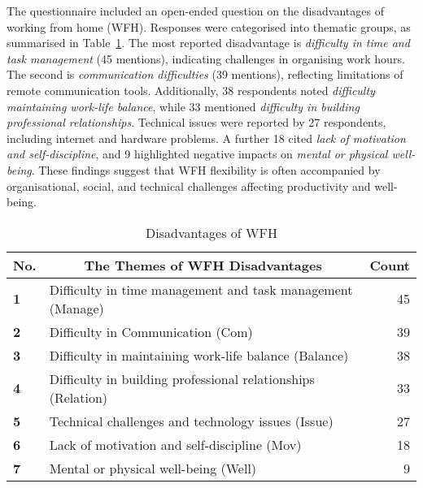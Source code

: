 \documentclass[conference]{IEEEtran}
\begin{document}
The questionnaire included an open-ended question on the disadvantages of working from home (WFH). Responses were categorised into thematic groups, as summarised in Table~\ref{Disadvantages of WFH}. The most reported disadvantage is \textit{difficulty in time and task management} (45 mentions), indicating challenges in organising work hours. The second is \textit{communication difficulties} (39 mentions), reflecting limitations of remote communication tools. Additionally, 38 respondents noted \textit{difficulty maintaining work-life balance}, while 33 mentioned \textit{difficulty in building professional relationships}. Technical issues were reported by 27 respondents, including internet and hardware problems. A further 18 cited \textit{lack of motivation and self-discipline}, and 9 highlighted negative impacts on \textit{mental or physical well-being}. These findings suggest that WFH flexibility is often accompanied by organisational, social, and technical challenges affecting productivity and well-being.

\begin{table}[ht]
	\caption{Disadvantages of WFH}
	\label{Disadvantages of WFH}
	\begin{tabular}{|p{}|p{}|r|}
		\hline
		\multicolumn{1}{|c|}{\textbf{No.}} & \multicolumn{1}{c|}{\textbf{The Themes of WFH Disadvantages}} & \multicolumn{1}{c|}{\textbf{Count}} \\ \hline
		\textbf{1}                 & Difficulty in time management and task management (Manage) & 45 %
		\\ \hline
		\textbf{2}                 & Difficulty in Communication (Com) & 39 %
		\\ \hline
		\textbf{3}                 & Difficulty in maintaining work-life balance (Balance)    & 38 %
		\\ \hline
		\textbf{4}                 & Difficulty in building professional relationships (Relation)  & 33 %
		\\ \hline
		\textbf{5}                 & Technical challenges and technology issues (Issue)     & 27
		\\ \hline
		\textbf{6}                 & Lack of motivation and self-discipline (Mov)       & 18 %
		\\ \hline
		\textbf{7}                 & Mental or physical well-being (Well) & 9               \\ \hline
	\end{tabular}
\end{table}
\end{document}
